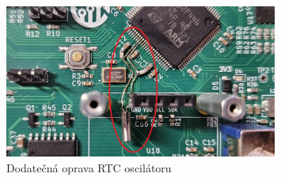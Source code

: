 \begin{figure}[h]
    \centering
    \includegraphics[width=0.8\textwidth]{obrazky/RTCcrystal}
    \caption{Dodatečná oprava RTC oscilátoru}
    \label{fig:RTCcrystal}
\end{figure}





